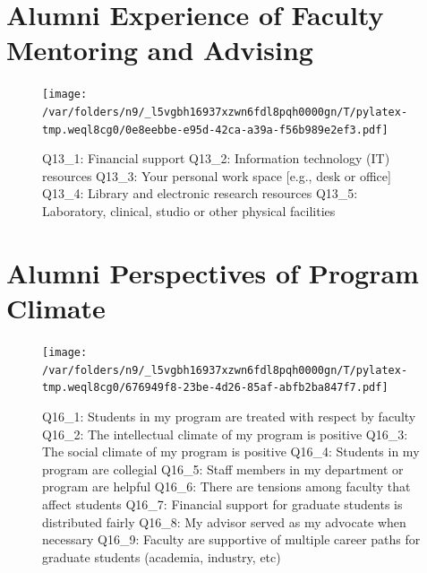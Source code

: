 \documentclass{article}%
\begin{document}
%
\section{Alumni Experience of Faculty Mentoring and Advising}%
\label{sec:AlumniExperienceofFacultyMentoringandAdvising}%


\begin{figure}[H]%
\centering%
\texttt{[image: /var/folders/n9/\_l5vgbh16937xzwn6fdl8pqh0000gn/T/pylatex-tmp.weql8cg0/0e8eebbe-e95d-42ca-a39a-f56b989e2ef3.pdf]}%
\caption{\newline%
Q13\_1: Financial support\newline%
Q13\_2: Information technology (IT) resources\newline%
Q13\_3: Your personal work space {[}e.g., desk or office{]}\newline%
Q13\_4: Library and electronic research resources\newline%
Q13\_5: Laboratory, clinical, studio or other physical facilities}%
\end{figure}

%
\section{Alumni Perspectives of Program Climate}%
\label{sec:AlumniPerspectivesofProgramClimate}%


\begin{figure}[H]%
\centering%
\texttt{[image: /var/folders/n9/\_l5vgbh16937xzwn6fdl8pqh0000gn/T/pylatex-tmp.weql8cg0/676949f8-23be-4d26-85af-abfb2ba847f7.pdf]}%
\caption{\newline%
Q16\_1: Students in my program are treated with respect by faculty\newline%
Q16\_2: The intellectual climate of my program is positive\newline%
Q16\_3: The social climate of my program is positive\newline%
Q16\_4: Students in my program are collegial\newline%
Q16\_5: Staff members in my department or program are helpful\newline%
Q16\_6: There are tensions among faculty that affect students\newline%
Q16\_7: Financial support for graduate students is distributed fairly\newline%
Q16\_8: My advisor served as my advocate when necessary\newline%
Q16\_9: Faculty are supportive of multiple career paths for graduate students (academia, industry, etc)}%
\end{figure}

%
\end{document}
